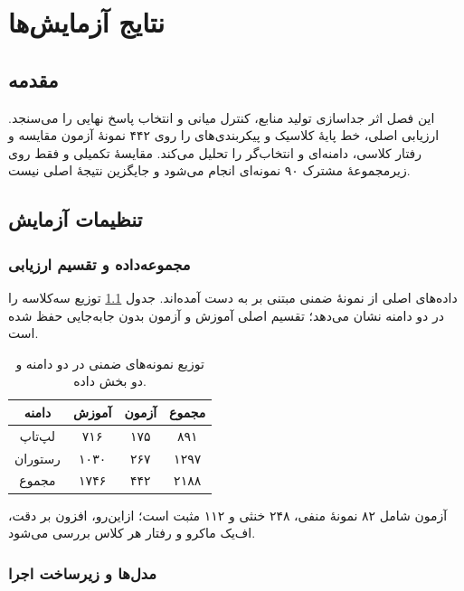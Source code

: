 \chapter{نتایج آزمایش‌ها}

\section{مقدمه}

این فصل اثر جداسازی تولید منابع، کنترل میانی و انتخاب پاسخ نهایی را می‌سنجد. ارزیابی اصلی، خط پایۀ کلاسیک و پیکربندی‌های  را روی ۴۴۲ نمونۀ آزمون مقایسه و رفتار کلاسی، دامنه‌ای و انتخاب‌گر را تحلیل می‌کند. مقایسۀ تکمیلی  و  فقط روی زیرمجموعۀ مشترک ۹۰ نمونه‌ای انجام می‌شود و جایگزین نتیجۀ اصلی نیست.

\section{تنظیمات آزمایش}

\subsection{مجموعه‌داده و تقسیم ارزیابی}

داده‌های اصلی از نمونۀ ضمنی  مبتنی بر  به دست آمده‌اند. جدول \ref{tab:ch5-data-splits} توزیع سه‌کلاسه را در دو دامنه نشان می‌دهد؛ تقسیم اصلی آموزش و آزمون بدون جابه‌جایی حفظ شده است.

\begin{table}[htbp]
    \centering
    \caption{توزیع نمونه‌های ضمنی در دو دامنه و دو بخش داده.}
    \label{tab:ch5-data-splits}
    \small
    \begin{tabular}{|c|c|c|c|}
        \hline
        \textbf{دامنه} & \textbf{آموزش} & \textbf{آزمون} & \textbf{مجموع} \\
        \hline
        لپ‌تاپ & ۷۱۶ & ۱۷۵ & ۸۹۱ \\
        \hline
        رستوران & ۱۰۳۰ & ۲۶۷ & ۱۲۹۷ \\
        \hline
        مجموع & ۱۷۴۶ & ۴۴۲ & ۲۱۸۸ \\
        \hline
    \end{tabular}
\end{table}

آزمون شامل ۸۲ نمونۀ منفی، ۲۴۸ خنثی و ۱۱۲ مثبت است؛ ازاین‌رو، افزون بر دقت، اف‌یک ماکرو و رفتار هر کلاس بررسی می‌شود.

\subsection{مدل‌ها و زیرساخت اجرا}


